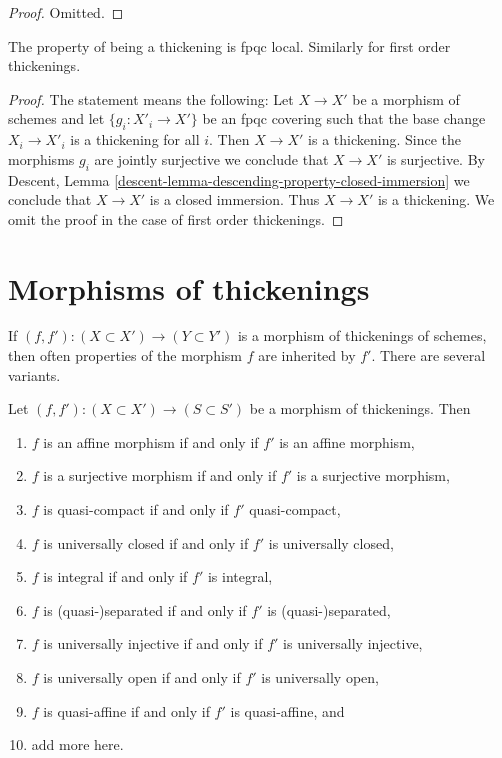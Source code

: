 \begin{proof}
Omitted.
\end{proof}

\begin{lemma}
\label{lemma-descending-property-thickening}
The property of being a thickening is fpqc local.
Similarly for first order thickenings.
\end{lemma}

\begin{proof}
The statement means the following: Let $X \to X'$ be a morphism
of schemes and let $\{g_i : X'_i \to X'\}$
be an fpqc covering such that the base change $X_i \to X'_i$
is a thickening for all $i$. Then $X \to X'$ is a thickening.
Since the morphisms $g_i$ are jointly surjective we conclude
that $X \to X'$ is surjective. By
Descent, Lemma \ref{descent-lemma-descending-property-closed-immersion}
we conclude that $X \to X'$ is a closed immersion.
Thus $X \to X'$ is a thickening. We omit the proof in the
case of first order thickenings.
\end{proof}









\section{Morphisms of thickenings}
\label{section-morphisms-thickenings}

\noindent
If $(f, f') : (X \subset X') \to (Y \subset Y')$ is a morphism
of thickenings of schemes, then often properties of the morphism
$f$ are inherited by $f'$. There are several variants.

\begin{lemma}
\label{lemma-thicken-property-morphisms}
Let $(f, f') : (X \subset X') \to (S \subset S')$ be a morphism
of thickenings. Then
\begin{enumerate}
\item $f$ is an affine morphism if and only if $f'$ is an affine morphism,
\item $f$ is a surjective morphism if and only if $f'$ is a surjective morphism,
\item $f$ is quasi-compact if and only if $f'$ quasi-compact,
\item $f$ is universally closed if and only if $f'$ is universally closed,
\item $f$ is integral if and only if $f'$ is integral,
\item $f$ is (quasi-)separated if and only if $f'$ is (quasi-)separated,
\item $f$ is universally injective if and only if $f'$ is universally injective,
\item $f$ is universally open if and only if $f'$ is universally open,
\item $f$ is quasi-affine if and only if $f'$ is quasi-affine, and
\item add more here.
\end{enumerate}
\end{lemma}


